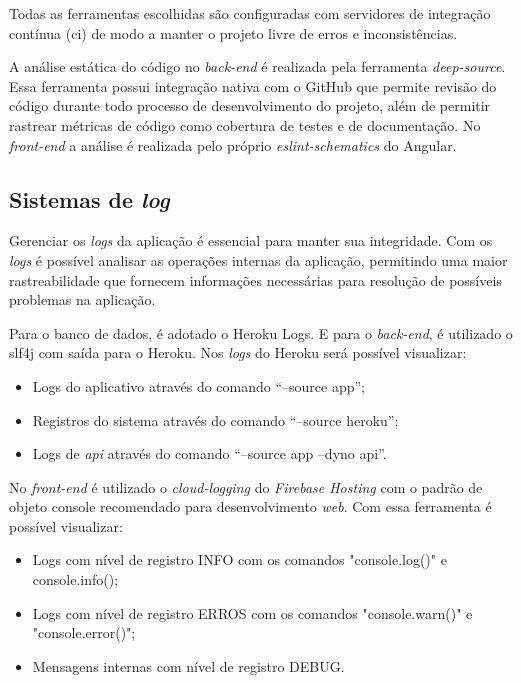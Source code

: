 

Todas as ferramentas escolhidas são configuradas com servidores de integração contínua (\ac{ci}) de modo a manter o projeto livre de erros e inconsistências.

A análise estática do código no \textit{\gls{back-end}} é realizada pela ferramenta \textit{\gls{deep-source}}. Essa ferramenta possui integração nativa com o GitHub que permite revisão do código durante todo processo de desenvolvimento do projeto, além de permitir rastrear métricas de código como cobertura de testes e de documentação. No \textit{\gls{front-end}} a análise é realizada pelo próprio \textit{\gls{eslint-schematics}} do Angular.


\subsection{Sistemas de \textit{log}}
Gerenciar os \textit{\glspl{log}} da aplicação é essencial para manter sua integridade. Com os \textit{\glspl{log}} é possível analisar as operações internas da aplicação, permitindo uma maior rastreabilidade que fornecem informações necessárias para resolução de possíveis problemas na aplicação.


Para o banco de dados, é adotado o Heroku Logs.
E para o \textit{\gls{back-end}}, é utilizado o \ac{slf4j} com saída para o Heroku.  Nos \textit{\glspl{log}}  do Heroku será possível visualizar: 
\begin{itemize}
\item Logs do aplicativo através do comando “--source app”;
\item Registros do sistema através do comando “--source heroku”;
\item Logs de \textit{\ac{api}} através do comando “--source app --dyno api”.
\end{itemize}


No \textit{\gls{front-end}} é utilizado o \textit{\gls{cloud-logging}} do \textit{Firebase Hosting} com o padrão de objeto console recomendado para desenvolvimento \textit{web}. Com essa ferramenta é possível visualizar:
\begin{itemize}
\item Logs com nível de registro INFO com os comandos "console.log()" e console.info();
\item Logs com nível de registro ERROS com os comandos "console.warn()" e "console.error()";
\item Mensagens internas com nível de registro DEBUG.
\end{itemize}

